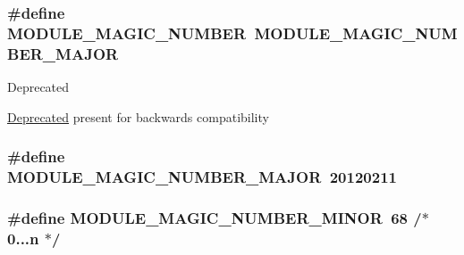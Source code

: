 \subsubsection[{\texorpdfstring{M\+O\+D\+U\+L\+E\+\_\+\+M\+A\+G\+I\+C\+\_\+\+N\+U\+M\+B\+ER}{MODULE_MAGIC_NUMBER}}]{\setlength{\rightskip}{0pt plus 5cm}\#define M\+O\+D\+U\+L\+E\+\_\+\+M\+A\+G\+I\+C\+\_\+\+N\+U\+M\+B\+ER~{\bf M\+O\+D\+U\+L\+E\+\_\+\+M\+A\+G\+I\+C\+\_\+\+N\+U\+M\+B\+E\+R\+\_\+\+M\+A\+J\+OR}}\hypertarget{group__APACHE__CORE__MMN_gacf76a081f9ed23e16f6bdb03abe96ec7}{}\label{group__APACHE__CORE__MMN_gacf76a081f9ed23e16f6bdb03abe96ec7}
\begin{DoxyRefDesc}{Deprecated}
\item[\hyperlink{deprecated__deprecated000001}{Deprecated}]present for backwards compatibility \end{DoxyRefDesc}
\subsubsection[{\texorpdfstring{M\+O\+D\+U\+L\+E\+\_\+\+M\+A\+G\+I\+C\+\_\+\+N\+U\+M\+B\+E\+R\+\_\+\+M\+A\+J\+OR}{MODULE_MAGIC_NUMBER_MAJOR}}]{\setlength{\rightskip}{0pt plus 5cm}\#define M\+O\+D\+U\+L\+E\+\_\+\+M\+A\+G\+I\+C\+\_\+\+N\+U\+M\+B\+E\+R\+\_\+\+M\+A\+J\+OR~20120211}\hypertarget{group__APACHE__CORE__MMN_ga317b5a0001d505331fafd3864636c2ad}{}\label{group__APACHE__CORE__MMN_ga317b5a0001d505331fafd3864636c2ad}
\subsubsection[{\texorpdfstring{M\+O\+D\+U\+L\+E\+\_\+\+M\+A\+G\+I\+C\+\_\+\+N\+U\+M\+B\+E\+R\+\_\+\+M\+I\+N\+OR}{MODULE_MAGIC_NUMBER_MINOR}}]{\setlength{\rightskip}{0pt plus 5cm}\#define M\+O\+D\+U\+L\+E\+\_\+\+M\+A\+G\+I\+C\+\_\+\+N\+U\+M\+B\+E\+R\+\_\+\+M\+I\+N\+OR~68                  /$\ast$ 0...{\bf n} $\ast$/}\hypertarget{group__APACHE__CORE__MMN_ga588f30a3c70ecc64ad0db18393cc34f2}{}\label{group__APACHE__CORE__MMN_ga588f30a3c70ecc64ad0db18393cc34f2}
